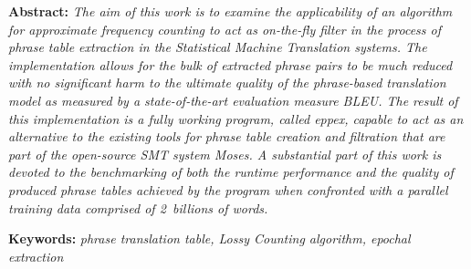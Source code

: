 \documentclass[12pt,a4paper]{report}
\let\openright=\clearpage
\begin{document}
{\textbf{Abstract:}
\emph{The aim of this work is to examine the applicability of an algorithm for
approximate frequency counting to act as on-the-fly filter in the process
of phrase table extraction in the Statistical Machine Translation systems.
The implementation allows for the bulk of extracted phrase pairs to be much
reduced with no significant harm to the ultimate quality of the phrase-based
translation model as measured by a state-of-the-art evaluation measure BLEU.
The result of this implementation is a fully working program, called eppex,
capable to act as an alternative to the existing tools for phrase table
creation and filtration that are part of the open-source SMT system Moses.
A substantial part of this work is devoted to the benchmarking of both
the runtime performance and the quality of produced phrase tables achieved
by the program when confronted with a parallel training data comprised of
2~billions of words.}

\textbf{Keywords:}
\emph{phrase translation table, Lossy Counting algorithm, epochal extraction}

\vss}

\newpage


\openright
\pagestyle{plain}
\setcounter{page}{1}
\tableofcontents
















\cleardoublepage
{}
{}
\end{document}

